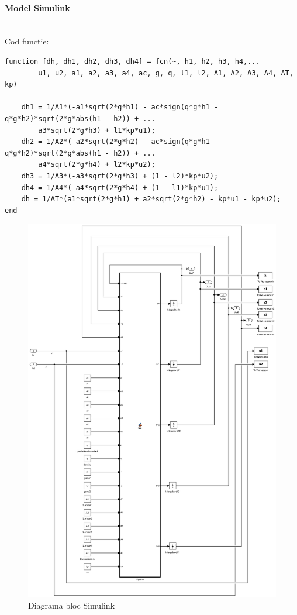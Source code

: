 \documentclass[12pt,english]{article}
\newcommand{\myparagraph}[1]{\paragraph{#1}\mbox{}\\}
\begin{document}
% 
\pagebreak
\myparagraph {Model Simulink}
Cod functie:
\begin{verbatim}
function [dh, dh1, dh2, dh3, dh4] = fcn(~, h1, h2, h3, h4,...
		u1, u2, a1, a2, a3, a4, ac, g, q, l1, l2, A1, A2, A3, A4, AT, kp)

    dh1 = 1/A1*(-a1*sqrt(2*g*h1) - ac*sign(q*g*h1 - q*g*h2)*sqrt(2*g*abs(h1 - h2)) + ...
    	a3*sqrt(2*g*h3) + l1*kp*u1);
    dh2 = 1/A2*(-a2*sqrt(2*g*h2) - ac*sign(q*g*h1 - q*g*h2)*sqrt(2*g*abs(h1 - h2)) + ...
    	a4*sqrt(2*g*h4) + l2*kp*u2);
    dh3 = 1/A3*(-a3*sqrt(2*g*h3) + (1 - l2)*kp*u2);
    dh4 = 1/A4*(-a4*sqrt(2*g*h4) + (1 - l1)*kp*u1);
    dh = 1/AT*(a1*sqrt(2*g*h1) + a2*sqrt(2*g*h2) - kp*u1 - kp*u2);
end
\end{verbatim}

\begin{figure} [H]
	\hspace*{-.25\textwidth}
	\includegraphics[width=1.5\textwidth]{system_schema.eps}
	\caption{Diagrama bloc Simulink}
\end{figure}
\end{document}
